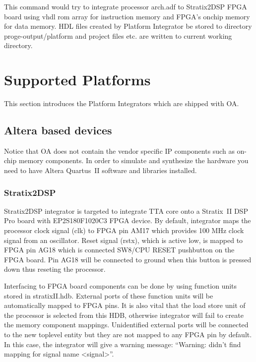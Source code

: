 \documentclass[a4paper,twoside]{tceusermanual}
\begin{document}
This command would try to integrate processor arch.adf to Stratix2DSP FPGA
board using vhdl rom array for instruction memory and FPGA's onchip memory for
data memory. HDL files created by Platform Integrator be stored to directory
proge-output/platform and project files etc. are written to current working
directory.

\section{Supported Platforms}

This section introduces the Platform Integrators which are shipped with OA.

\subsection{Altera based devices}

Notice that OA does not contain the vendor specific IP components such as
on-chip memory components. In order to simulate and synthesize the hardware
you need to have Altera Quartus~II software and libraries installed.

\subsubsection{Stratix2DSP}
\label{stratix2dspIntegrator}

Stratix2DSP integrator is targeted to integrate TTA core onto a
Stratix~II DSP Pro board with EP2S180F1020C3 FPGA device. By default,
integrator maps the processor clock signal (clk) to FPGA pin AM17
which provides 100 MHz clock signal from an oscillator. Reset signal
(rstx), which is active low, is mapped to FPGA pin AG18 which is
connected SW8/CPU RESET pushbutton on the FPGA board. Pin AG18 will be
connected to ground when this button is pressed down thus reseting the
processor.

Interfacing to FPGA board components can be done by using function units
stored in stratixII.hdb. External ports of these function units will be
automatically mapped to FPGA pins. It is also vital that the load store unit
of the processor is selected from this HDB, otherwise integrator will fail to
create the memory component mappings. Unidentified external ports will be connected
to the new toplevel entity but they are not mapped to any FPGA pin by default.
In this case, the integrator will give a warning message: ``Warning: didn't find
mapping for signal name <signal>''.
\end{document}
